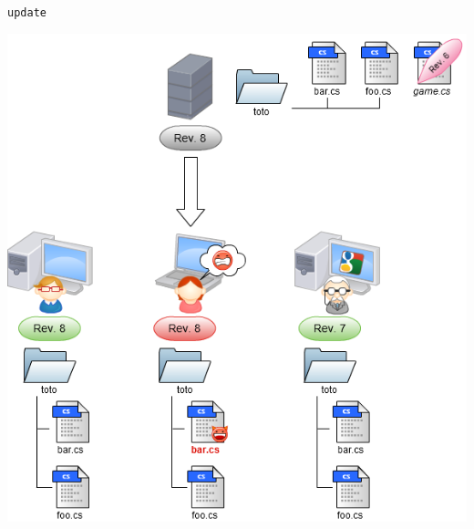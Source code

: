 \begin{frame}
  \texttt{update}
  \begin{center}
    \vspace{-12pt}
    \includegraphics[scale=0.3]{images/14-Conflict.png}
  \end{center}
\end{frame}

